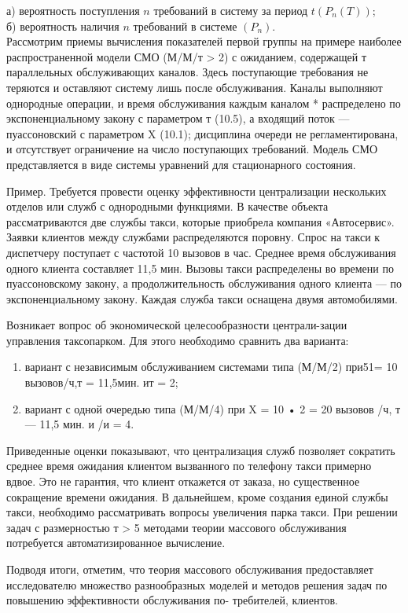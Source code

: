 а) вероятность поступления $n$ требований в систему за период $t(P_n(T))$;\\

б) вероятность наличия $n$ требований в системе $(P_n).$\\


Рассмотрим приемы вычисления показателей первой группы на примере наиболее распространенной модели СМО (М/М/т > 2) с ожиданием, содержащей т параллельных обслуживающих каналов. Здесь поступающие требования не теряются и оставляют систему лишь после обслуживания. Каналы выполняют однородные операции, и время обслуживания каждым каналом * распределено по экспоненциальному закону с параметром т (10.5), а входящий поток — пуассоновский с параметром X (10.1); дисциплина очереди не регламентирована, и отсутствует ограничение на число поступающих требований. Модель СМО представляется в виде системы уравнений для стационарного состояния.

Пример. Требуется провести оценку эффективности централизации нескольких отделов или служб с однородными функциями. В качестве объекта рассматриваются две службы такси, которые приобрела компания «Автосервис». Заявки клиентов между службами распределяются поровну. Спрос на такси к диспетчеру поступает с частотой 10 вызовов в час. Среднее время обслуживания одного клиента составляет 11,5 мин. Вызовы такси распределены во времени по пуассоновскому закону, а продолжительность обслуживания одного клиента — по экспоненциальному закону. Каждая служба такси оснащена двумя автомобилями.

Возникает вопрос об экономической целесообразности централи-зации управления таксопарком. Для этого необходимо сравнить два варианта:
\begin{enumerate}
	\item вариант с независимым обслуживанием системами типа (М/М/2) при51= 10 вызовов/ч,т = 11,5мин. ит = 2;
	\item вариант с одной очередью типа (М/М/4) при X = 10 • 2 = 20 вызовов /ч, т — 11,5 мин. и /и = 4.
\end{enumerate}

Приведенные оценки показывают, что централизация служб позволяет сократить среднее время ожидания клиентом вызванного по телефону такси примерно вдвое. Это не гарантия, что клиент откажется от заказа, но существенное сокращение времени ожидания. В дальнейшем, кроме создания единой службы такси, необходимо рассматривать вопросы увеличения парка такси. При решении задач с размерностью т > 5 методами теории массового обслуживания потребуется автоматизированное вычисление.

Подводя итоги, отметим, что теория массового обслуживания предоставляет исследователю множество разнообразных моделей и методов решения задач по повышению эффективности обслуживания по-
требителей, клиентов.